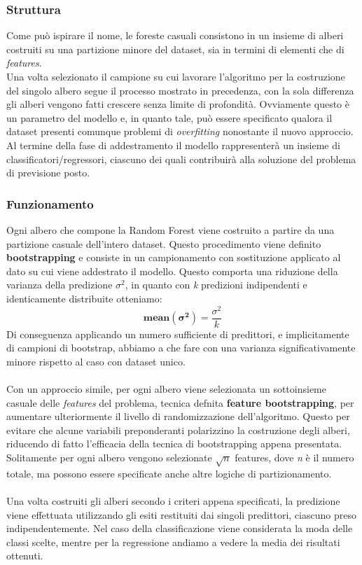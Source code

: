 \subsubsection{Struttura}
Come può ispirare il nome, le foreste casuali consistono in un insieme di alberi costruiti su una partizione minore del dataset, sia in termini di elementi che di \textit{features}.\\
Una volta selezionato il campione su cui lavorare l'algoritmo per la costruzione del singolo albero segue il processo mostrato in precedenza, con la sola differenza gli alberi vengono fatti crescere senza limite di profondità. Ovviamente questo è un parametro del modello e, in quanto tale, può essere specificato qualora il dataset presenti comunque problemi di \textit{overfitting} nonostante il nuovo approccio.\\
Al termine della fase di addestramento il modello rappresenterà un insieme di classificatori/regressori, ciascuno dei quali contribuirà alla soluzione del problema di previsione posto.

\subsubsection{Funzionamento}
Ogni albero che compone la Random Forest viene costruito a partire da una partizione casuale dell'intero dataset. Questo procedimento viene definito \textbf{bootstrapping} e consiste in un campionamento con sostituzione applicato al dato su cui viene addestrato il modello. Questo comporta una riduzione della varianza della predizione $\mathit{\sigma^2}$, in quanto con \textit{k} predizioni indipendenti e identicamente distribuite otteniamo: 
\[ \mathbf{mean(\sigma^2)} = \frac{\sigma^2}{k} \]
Di conseguenza applicando un numero sufficiente di predittori, e implicitamente di campioni di bootstrap, abbiamo a che fare con una varianza significativamente minore rispetto al caso con dataset unico.\\\\
Con un approccio simile, per ogni albero viene selezionata un sottoinsieme casuale delle \textit{features} del problema, tecnica defnita \textbf{feature bootstrapping}, per aumentare ulteriormente il livello di randomizzazione dell'algoritmo. Questo per evitare che alcune variabili preponderanti polarizzino la costruzione degli alberi, riducendo di fatto l'efficacia della tecnica di bootstrapping appena presentata. Solitamente per ogni albero vengono selezionate $\mathit{\sqrt{n}}$ features, dove \textit{n} è il numero totale, ma possono essere specificate anche altre logiche di partizionamento.\\\\
Una volta costruiti gli alberi secondo i criteri appena specificati, la predizione viene effettuata utilizzando gli esiti restituiti dai singoli predittori, ciascuno preso indipendentemente. Nel caso della classificazione viene considerata la moda delle classi scelte, mentre per la regressione andiamo a vedere la media dei risultati ottenuti.